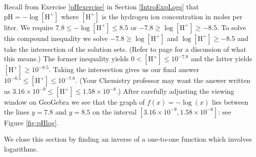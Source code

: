 {
Recall from Exercise \ref{pHexercise} in Section \ref{IntroExpLogs} that $\mbox{pH} = -\log[\mbox{H}^{+}]$ where $[\mbox{H}^{+}]$ is the hydrogen ion concentration in moles per liter.  We require $7.8 \leq -\log[\mbox{H}^{+}] \leq 8.5$ or $-7.8 \geq \log[\mbox{H}^{+}] \geq -8.5$.  To solve this compound inequality we solve $-7.8 \geq \log[\mbox{H}^{+}]$ and $ \log[\mbox{H}^{+}] \geq -8.5$ and take the intersection of the solution sets. (Refer to page \pageref{intersectionunion} for a discussion of what this means.)  The former inequality yields $0 < [\mbox{H}^{+}] \leq 10^{-7.8}$ and the latter yields $[\mbox{H}^{+}] \geq 10^{-8.5}$.  Taking the intersection gives us our final answer $10^{-8.5} \leq [\mbox{H}^{+}] \leq 10^{-7.8}$.  (Your Chemistry professor may want the answer written as $3.16 \times 10^{-9} \leq [\mbox{H}^{+}] \leq 1.58 \times 10^{-8}$.)  After carefully adjusting the viewing window on GeoGebra we see that the graph of $f(x) = -\log(x)$ lies between the lines $y = 7.8$ and $y = 8.5$ on the interval $[3.16 \times 10^{-9}, 1.58 \times 10^{-8}]$: see Figure \ref{fig:pHlog}.


{}
}

\medskip

We close this section by finding an inverse of a one-to-one function which involves logarithms.

\pagebreak

